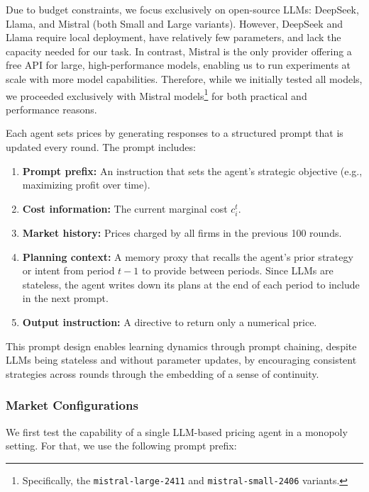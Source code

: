Due to budget constraints, we focus exclusively on open-source LLMs: DeepSeek, Llama, and Mistral (both Small and Large variants). However, DeepSeek and Llama require local deployment, have relatively few parameters, and lack the capacity needed for our task. In contrast, Mistral is the only provider offering a free API for large, high-performance models, enabling us to run experiments at scale with more model capabilities. Therefore, while we initially tested all models, we proceeded exclusively with Mistral models\footnote{Specifically, the \texttt{mistral-large-2411} and \texttt{mistral-small-2406} variants.} for both practical and performance reasons.

Each agent sets prices by generating responses to a structured prompt that is updated every round. The prompt includes:

\begin{enumerate}
    \item \textbf{Prompt prefix:} An instruction that sets the agent’s strategic objective (e.g., maximizing profit over time).
    \item \textbf{Cost information:} The current marginal cost $c_i^t$.
    \item \textbf{Market history:} Prices charged by all firms in the previous 100 rounds.
    \item \textbf{Planning context:} A memory proxy that recalls the agent’s prior strategy or intent from period $t-1$ to provide  between periods. Since LLMs are stateless, the agent writes down its plans at the end of each period to include in the next prompt. 
    \item \textbf{Output instruction:} A directive to return only a numerical price.
\end{enumerate}

This prompt design enables learning dynamics through prompt chaining, despite LLMs being stateless and without parameter updates, by encouraging consistent strategies across rounds through the embedding of a sense of continuity.


\subsubsection*{Market Configurations}

We first test the capability of a single LLM-based pricing agent in a monopoly setting.  For that, we use the following prompt prefix:

